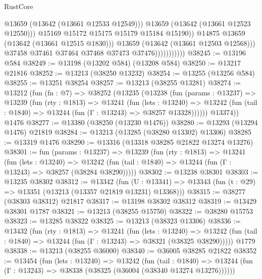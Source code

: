 \begin{lexlean}{RustCore}
\begin{coremodule}
                                      @13659
                                      (@13642 (@13661 @12533 @12549)))
                                    @13659
                                    (@13642 (@13661 @12523 @12550)))
                                  @15169
                                  @15172
                                  @15175
                                  @15179
                                  @15184
                                  @15190))
                              @14875
                              @13659
                              (@13642 (@13661 @12515 @1830)))
                            @13659
                            (@13642 (@13661 @12503 @12568)))
                          @37458
                          @37461
                          @37464
                          @37468
                          @37473
                          @37476)))))))))))
@38245 := @13196 @584
@38249 := @13198 (@13202 @584) (@13208 @584)
@38250 := @13217 @21816
@38252 := @13213 (@38250 @13232)
@38254 := @13255 (@13256 @584)
@38255 := @13251 @38254
@38257 := @13213 (@38255 @13281)
@38274 := @13212
    (fun (fn : @7) =>
    @38252
      (@13235
        (@13238
          (fun (params : @13237) =>
          @13239
            (fun (rty : @1813) =>
            @13241
              (fun (lets : @13240) =>
              @13242 (fun (tail : @1840) => @13244 (fun (Γ : @13243) => @38257 @13328))))))
        @13374))
    @1476
@38277 := @13380 (@38250 (@13230 @1476))
@38280 := @13293 (@13294 @1476) @21819
@38284 := @13213 (@13285 (@38280 @13302) @13306)
@38285 := @13319 @1476
@38290 := @13316 (@13318 @38285 @21822 @13274 @13276)
@38301 := fun (params : @13237) =>
  @13239
    (fun (rty : @1813) =>
    @13241
      (fun (lets : @13240) =>
      @13242 (fun (tail : @1840) => @13244 (fun (Γ : @13243) => @38257 (@38284 @38290)))))
@38302 := @13238 @38301
@38303 := @13235 @38302
@38312 := @13342
    (fun (U : @13341) => @13343 (fun (t : @29) => @13351 (@13213 (@13357 @21819 @13231) @13368)))
@38315 := @38277 (@38303 @38312) @21817
@38317 := @13198 @38302 @38312
@38319 := @13429 @38301 @1787
@38321 := @13213 (@38255 @15750)
@38322 := @38280 @15753
@38323 := @13285 @38322
@38325 := @13213 (@38323 @13306)
@38336 := @13432
    (fun (rty : @1813) =>
    @13241
      (fun (lets : @13240) =>
      @13242 (fun (tail : @1840) => @13244 (fun (Γ : @13243) => @38321 (@38325 @38290)))))
    @1779
@38338 := @13213 (@38255 @36000)
@38340 := @36005 @38285 @21822
@38352 := @13454
    (fun (lets : @13240) =>
    @13242
      (fun (tail : @1840) =>
      @13244 (fun (Γ : @13243) => @38338 (@38325 (@36004 (@38340 @13274 @13276))))))

\end{coremodule}
\end{lexlean}
